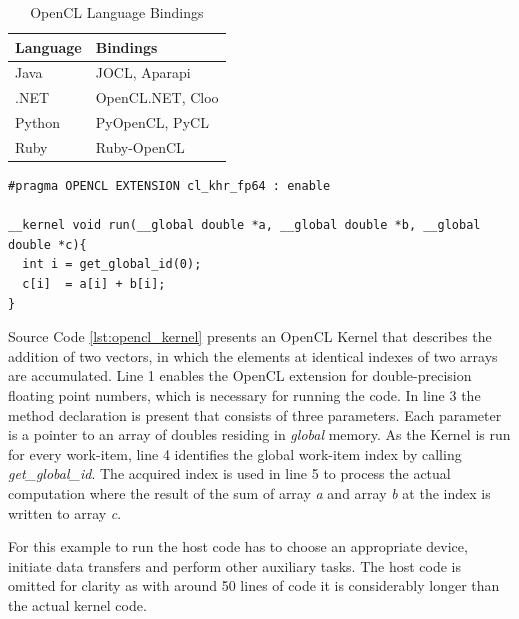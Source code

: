 \begin{table}[htb]
	\centering
	\begin{adjustbox}{width=0.3\textwidth}
		\small
		\begin{tabular}{l | l}
			\textbf{Language}	& \textbf{Bindings}   \\
			\hline
			Java        &  JOCL, Aparapi\\
			.NET        &  OpenCL.NET, Cloo\\
			Python      &  PyOpenCL, PyCL\\
			Ruby	    &  Ruby-OpenCL\\


		\end{tabular}
	\end{adjustbox}
	
	\caption{OpenCL Language Bindings}
	\label{table:opencl_language_bindings}
\end{table}

\begin{minipage}{\linewidth}

\begin{lstlisting}[caption=OpenCL Vector Addition Kernel,captionpos=b,label={lst:opencl_kernel}]
#pragma OPENCL EXTENSION cl_khr_fp64 : enable

__kernel void run(__global double *a, __global double *b, __global double *c){
  int i = get_global_id(0);
  c[i]  = a[i] + b[i];
}
\end{lstlisting}
\end{minipage}
Source Code \ref{lst:opencl_kernel} presents an OpenCL Kernel that describes the addition of two vectors, in which the elements at identical indexes of two arrays are accumulated. Line 1 enables the OpenCL extension for double-precision floating point numbers, which is necessary for running the code. In line 3 the method declaration is present that consists of three parameters. Each parameter is a pointer to an array of doubles residing in \textit{global} memory. As the Kernel is run for every work-item, line 4 identifies the global work-item index by calling \textit{get\_global\_id}. The acquired index is used in line 5 to process the actual computation where the result of the sum of array \textit{a} and array \textit{b} at the index is written to array \textit{c}.

For this example to run the host code has to choose an appropriate device, initiate data transfers and perform other auxiliary tasks. The host code is omitted for clarity as with around 50 lines of code it is considerably longer than the actual kernel code. 

